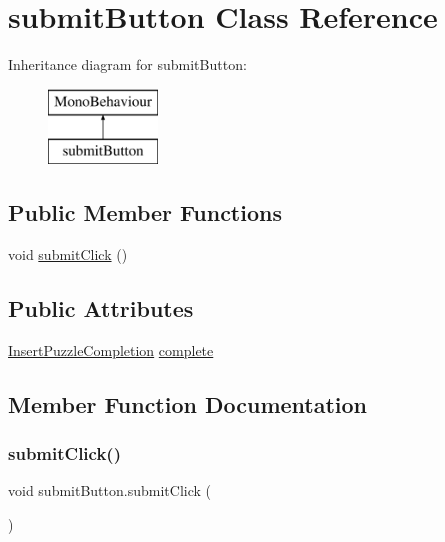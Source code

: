 \hypertarget{classsubmit_button}{}\section{submit\+Button Class Reference}
\label{classsubmit_button}
Inheritance diagram for submit\+Button\+:\begin{figure}[H]
\begin{center}
\leavevmode
\includegraphics[height=2.000000cm]{classsubmit_button}
\end{center}
\end{figure}
\subsection*{Public Member Functions}
\begin{DoxyCompactItemize}
\item 
void \hyperlink{classsubmit_button_a682e0af5e758d552d985e64a1003f7cd}{submit\+Click} ()
\end{DoxyCompactItemize}
\subsection*{Public Attributes}
\begin{DoxyCompactItemize}
\item 
\hyperlink{class_insert_puzzle_completion}{Insert\+Puzzle\+Completion} \hyperlink{classsubmit_button_a1346ad28f62e29199c2f2fb7859d47cb}{complete}
\end{DoxyCompactItemize}


\subsection{Member Function Documentation}
\mbox{\label{classsubmit_button_a682e0af5e758d552d985e64a1003f7cd}} 
\subsubsection{\texorpdfstring{submit\+Click()}{submitClick()}}
{\footnotesize\ttfamily void submit\+Button.\+submit\+Click (\begin{DoxyParamCaption}{ }\end{DoxyParamCaption})}




